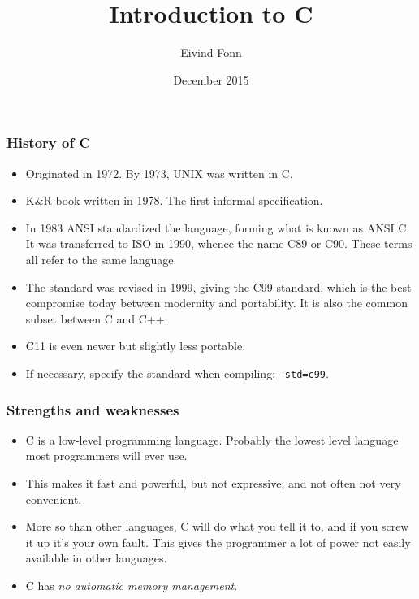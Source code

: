 

\title{Introduction to C}
\author{Eivind Fonn}
\date{December 2015}
\maketitle

\begin{frame}
  \frametitle{History of C}
  \begin{itemize}
  \item Originated in 1972. By 1973, UNIX was written in C.
  \item K\&R book written in 1978. The first informal specification.
  \item In 1983 ANSI standardized the language, forming what is known as ANSI C.
    It was transferred to ISO in 1990, whence the name C89 or C90. These terms
    all refer to the same language.
  \item The standard was revised in 1999, giving the C99 standard, which is the
    best compromise today between modernity and portability. It is also the
    common subset between C and C++.
  \item C11 is even newer but slightly less portable.
  \item If necessary, specify the standard when compiling: \texttt{-std=c99}.
  \end{itemize}
\end{frame}

\begin{frame}
  \frametitle{Strengths and weaknesses}
  \begin{itemize}
  \item C is a low-level programming language. Probably the lowest level
    language most programmers will ever use.
  \item This makes it fast and powerful, but not expressive, and not often not
    very convenient.
  \item More so than other languages, C will do what you tell it to, and if you
    screw it up it's your own fault. This gives the programmer a lot of power
    not easily available in other languages.
  \item C has \emph{no automatic memory management}.
  \end{itemize}
\end{frame}

